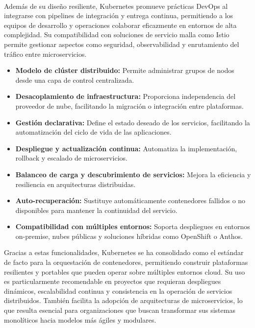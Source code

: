 {            \paragraph{}Además de su diseño resiliente, Kubernetes promueve prácticas DevOps al integrarse con pipelines de integración y entrega continua, permitiendo a los equipos de desarrollo y operaciones colaborar eficazmente en entornos de alta complejidad. Su compatibilidad con soluciones de servicio malla como Istio permite gestionar aspectos como seguridad, observabilidad y enrutamiento del tráfico entre microservicios.
                
            \begin{itemize}
                \item \textbf{Modelo de clúster distribuido:} Permite administrar grupos de nodos desde una capa de control centralizada.
                \item \textbf{Desacoplamiento de infraestructura:} Proporciona independencia del proveedor de nube, facilitando la migración o integración entre plataformas.
                \item \textbf{Gestión declarativa:} Define el estado deseado de los servicios, facilitando la automatización del ciclo de vida de las aplicaciones.
                \item \textbf{Despliegue y actualización continua:} Automatiza la implementación, rollback y escalado de microservicios.
                \item \textbf{Balanceo de carga y descubrimiento de servicios:} Mejora la eficiencia y resiliencia en arquitecturas distribuidas.
                \item \textbf{Auto-recuperación:} Sustituye automáticamente contenedores fallidos o no disponibles para mantener la continuidad del servicio.
                \item \textbf{Compatibilidad con múltiples entornos:} Soporta despliegues en entornos on-premise, nubes públicas y soluciones híbridas como OpenShift o Anthos.
            \end{itemize}
                
            Gracias a estas funcionalidades, Kubernetes se ha consolidado como el estándar de facto para la orquestación de contenedores, permitiendo construir plataformas resilientes y portables que pueden operar sobre múltiples entornos cloud. Su uso es particularmente recomendable en proyectos que requieran despliegues dinámicos, escalabilidad continua y consistencia en la operación de servicios distribuidos. También facilita la adopción de arquitecturas de microservicios, lo que resulta esencial para organizaciones que buscan transformar sus sistemas monolíticos hacia modelos más ágiles y modulares.
        
}